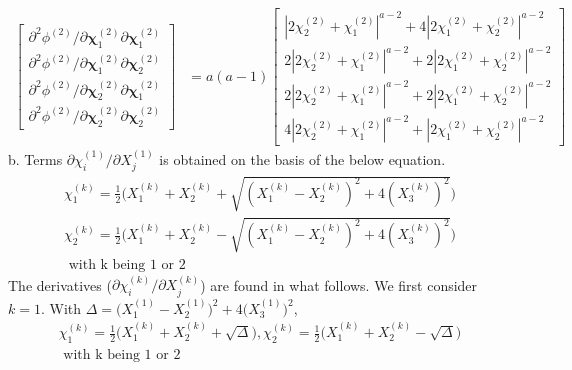 \documentclass[12pt]{amsart}
\begin{document}
\begin{equation}
  \label{eq:derivative_2_4}
  \begin{split}
    \begin{bmatrix}
      \partial^2\phi^{(2)}/\partial\mathbf{\chi}^{(2)}_1\partial\mathbf{\chi}^{(2)}_1\\
      \partial^2\phi^{(2)}/\partial\mathbf{\chi}^{(2)}_1\partial\mathbf{\chi}^{(2)}_2\\
      \partial^2\phi^{(2)}/\partial\mathbf{\chi}^{(2)}_2\partial\mathbf{\chi}^{(2)}_1\\
      \partial^2\phi^{(2)}/\partial\mathbf{\chi}^{(2)}_2\partial\mathbf{\chi}^{(2)}_2
    \end{bmatrix}
    &=a(a-1)
    \begin{bmatrix}
      |2\chi^{(2)}_2+\chi^{(2)}_1|^{a-2}+4|2\chi^{(2)}_1+\chi^{(2)}_2|^{a-2}\\
      2|2\chi^{(2)}_2+\chi^{(2)}_1|^{a-2}+2|2\chi^{(2)}_1+\chi^{(2)}_2|^{a-2}\\
      2|2\chi^{(2)}_2+\chi^{(2)}_1|^{a-2}+2|2\chi^{(2)}_1+\chi^{(2)}_2|^{a-2}\\
      4|2\chi^{(2)}_2+\chi^{(2)}_1|^{a-2}+|2\chi^{(2)}_1+\chi^{(2)}_2|^{a-2}
    \end{bmatrix}
  \end{split}
\end{equation}
\newline
b. Terms $\partial\chi^{(1)}_i/\partial X^{(1)}_j$ is obtained on the basis of the below equation.
\begin{equation}
  \label{eq:princ}
  \begin{split}
    \chi_1^{(k)}=\frac{1}{2}\bigg(X_1^{(k)}+X_2^{(k)}+\sqrt{(X_1^{(k)}-X_2^{(k)})^2+4(X_3^{(k)})^2}\bigg)\\
    \chi_2^{(k)}=\frac{1}{2}\bigg(X_1^{(k)}+X_2^{(k)}-\sqrt{(X_1^{(k)}-X_2^{(k)})^2+4(X_3^{(k)})^2}\bigg)\\
    \text{ with k being 1 or 2}
  \end{split}
\end{equation}
The derivatives ($\partial\chi_i^{(k)}/\partial X_j^{(k)}$) are found in what follows.
We first consider $k=1$.
With $\Delta=\big(X^{(1)}_1-X^{(1)}_2\big)^2 +4\big(X^{(1)}_3\big)^2$,
\begin{equation}
  \label{eq:princ1}
  \begin{split}
    \chi_1^{(k)}=\frac{1}{2}\bigg(X_1^{(k)}+X_2^{(k)}+\sqrt{\Delta}\bigg), \chi_2^{(k)}=\frac{1}{2}\bigg(X_1^{(k)}+X_2^{(k)}-\sqrt{\Delta}\bigg)\\
    \text{ with k being 1 or 2}
  \end{split}
\end{equation}
\end{document}

